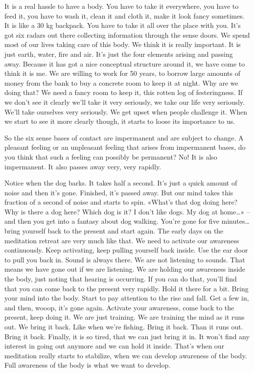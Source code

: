 \documentclass[letterpaper,10pt,english]{sphinxmanual}
\begin{document}
\sphinxAtStartPar
It is a real hassle to have a body. You have to take it everywhere, you
have to feed it, you have to wash it, clean it and cloth it, make it look fancy
sometimes. It is like a 30 kg backpack. You have to take it all over the place
with  you.  It’s  got  six  radars  out  there  collecting  information  through  the
sense doors. We spend most of our lives taking care of this body. We think
it is really important. It is just earth, water, fire and air. It’s just the four elements arising and passing away. Because it has got a nice conceptual structure around it, we have come to think it is me. We are willing to work for 50
years, to borrow large amounts of money from the bank to buy a concrete
room to keep it at night. Why are we doing that? We need a fancy room to
keep it, this rotten log of festeringness. If we don’t see it clearly we’ll take it
very seriously, we take our life very seriously. We’ll take ourselves very seriously. We get upset when people challenge it. When we start to see it more
clearly though, it starts to loose its importance to us.

\sphinxAtStartPar
So the six sense bases of contact are impermanent and are subject to
change. A pleasant feeling or an unpleasant feeling that arises from impermanent bases, do you think that such a feeling can possibly be permanent?
No! It is also impermanent. It also passes away very, very rapidly.

\sphinxAtStartPar
Notice  when  the  dog  barks.  It  takes  half  a  second.  It’s  just  a  quick
amount of noise and then it’s gone. Finished, it’s passed away. But our mind
takes this fraction of a second of noise and starts to spin. «What’s that dog
  doing here? Why is there a dog here? Which dog is it? I don’t like dogs. My
dog at home…» – and then you get into a fantasy about dog walking. You’re
gone  for  five  minutes…bring  yourself  back  to  the  present  and  start  again.
The early days on the meditation retreat are very much like that. We need to
activate our awareness continuously. Keep activating, keep pulling yourself
back inside. Use the ear door to pull you back in. Sound is always there. We
are not listening to sounds. That means we have gone out if we are listening. We are holding our awareness inside the body, just noting that hearing
is occurring. If you can do that, you’ll find that you can come back to the
present very rapidly. Hold it there for a bit. Bring your mind into the body.
Start to pay attention to the rise and fall. Get a few in, and then, wooop, it’s
gone again. Activate your awareness, come back to the present, keep doing
it. We are just training. We are training the mind as it runs out. We bring it
back. Like when we’re fishing. Bring it back. Than it runs out. Bring it back.
Finally, it is so tired, that we can just bring it in. It won’t find any interest
in going out anymore and we can hold it inside. That’s when our meditation
really starts to stabilize, when we can develop awareness of the body. Full
awareness of the body is what we want to develop.
\end{document}
